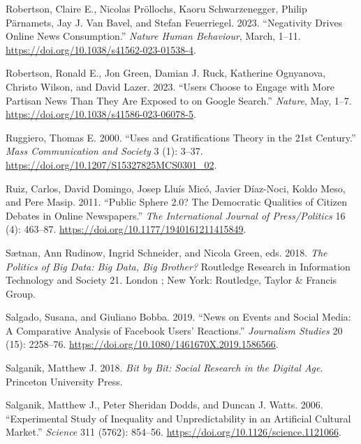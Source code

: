 \documentclass[
]{article}
\newlength{\cslhangindent}
\newlength{\cslentryspacingunit} %
\newenvironment{CSLReferences}[2] %
 {%
  \setlength{\parindent}{0pt}
  \ifodd #1
  \let\oldpar\par
  \def\par{\hangindent=\cslhangindent\oldpar}
  \fi
  \setlength{\parskip}{#2\cslentryspacingunit}
 }%
 {}
\begin{document}
\begin{CSLReferences}{1}{0}
\leavevmode{}%
Robertson, Claire E., Nicolas Pröllochs, Kaoru Schwarzenegger, Philip
Pärnamets, Jay J. Van Bavel, and Stefan Feuerriegel. 2023. {``Negativity
Drives Online News Consumption.''} \emph{Nature Human Behaviour}, March,
1--11. \url{https://doi.org/10.1038/s41562-023-01538-4}.

\leavevmode{}%
Robertson, Ronald E., Jon Green, Damian J. Ruck, Katherine Ognyanova,
Christo Wilson, and David Lazer. 2023. {``Users Choose to Engage with
More Partisan News Than They Are Exposed to on {Google} {Search}.''}
\emph{Nature}, May, 1--7.
\url{https://doi.org/10.1038/s41586-023-06078-5}.

\leavevmode{}%
Ruggiero, Thomas E. 2000. {``Uses and {Gratifications} {Theory} in the
21st {Century}.''} \emph{Mass Communication and Society} 3 (1): 3--37.
\url{https://doi.org/10.1207/S15327825MCS0301_02}.

\leavevmode{}%
Ruiz, Carlos, David Domingo, Josep Lluís Micó, Javier Díaz-Noci, Koldo
Meso, and Pere Masip. 2011. {``Public {Sphere} 2.0? {The} {Democratic}
{Qualities} of {Citizen} {Debates} in {Online} {Newspapers}.''}
\emph{The International Journal of Press/Politics} 16 (4): 463--87.
\url{https://doi.org/10.1177/1940161211415849}.

\leavevmode{}%
Sætnan, Ann Rudinow, Ingrid Schneider, and Nicola Green, eds. 2018.
\emph{The Politics of Big Data: Big Data, Big Brother?} Routledge
Research in Information Technology and Society 21. London ; New York:
Routledge, Taylor \& Francis Group.

\leavevmode{}%
Salgado, Susana, and Giuliano Bobba. 2019. {``News on {Events} and
{Social} {Media}: {A} {Comparative} {Analysis} of {Facebook} {Users}'
{Reactions}.''} \emph{Journalism Studies} 20 (15): 2258--76.
\url{https://doi.org/10.1080/1461670X.2019.1586566}.

\leavevmode{}%
Salganik, Matthew J. 2018. \emph{Bit by {Bit}: {Social} {Research} in
the {Digital} {Age}}. Princeton University Press.

\leavevmode{}%
Salganik, Matthew J., Peter Sheridan Dodds, and Duncan J. Watts. 2006.
{``Experimental {Study} of {Inequality} and {Unpredictability} in an
{Artificial} {Cultural} {Market}.''} \emph{Science} 311 (5762): 854--56.
\url{https://doi.org/10.1126/science.1121066}.


\end{CSLReferences}
\end{document}

